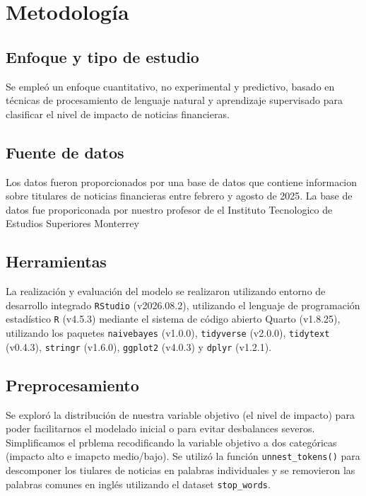 \documentclass{Academic}
\begin{document}
\section{Metodología}

\subsection{Enfoque y tipo de estudio}
Se empleó un enfoque cuantitativo, no experimental y predictivo, basado en técnicas de 
procesamiento de lenguaje natural y aprendizaje supervisado para clasificar el nivel 
de impacto de noticias financieras.

\subsection{Fuente de datos}
Los datos fueron proporcionados por una base de datos que contiene informacion sobre titulares de noticias
financieras entre febrero y agosto de 2025. La base de datos fue proporiconada por nuestro profesor de el
Instituto Tecnologico de Estudios Superiores Monterrey


\subsection{Herramientas}
La realización y evaluación del modelo se realizaron utilizando entorno de desarrollo 
integrado \texttt{RStudio} (v2026.08.2), utilizando el lenguaje de programación 
estadístico \texttt{R} (v4.5.3) \cite{R} mediante el sistema de código abierto 
Quarto (v1.8.25), utilizando los paquetes \texttt{naivebayes} (v1.0.0), 
\texttt{tidyverse} (v2.0.0),  \texttt{tidytext} (v0.4.3),  \texttt{stringr} (v1.6.0),  
\texttt{ggplot2} (v4.0.3) y \texttt{dplyr} (v1.2.1).

\subsection{Preprocesamiento}
Se exploró la distribución de nuestra variable objetivo (el nivel de impacto) para poder facilitarnos el modelado
inicial o para evitar desbalances severos. Simplificamos el prblema recodificando la variable objetivo a dos categóricas 
(impacto alto e imapcto medio/bajo). Se utilizó la función \texttt{unnest\_tokens()} para descomponer 
los tiulares de noticias en palabras individuales y se removieron las palabras comunes en inglés utilizando 
el dataset \texttt{stop\_words}.
\end{document}
